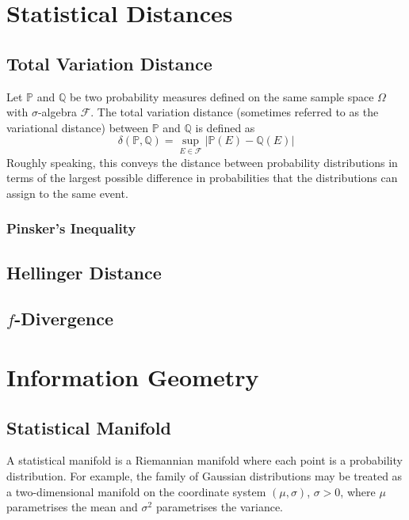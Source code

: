 \documentclass[11pt]{report} %
\begin{document}
\section{Statistical Distances}

\subsection{Total Variation Distance}

Let $\mathbb{P}$ and $\mathbb{Q}$ be two probability measures defined on the same sample space $\Omega$ with $\sigma$-algebra $\mathcal{F}$. The total variation distance (sometimes referred to as the variational distance) between  $\mathbb{P}$ and $\mathbb{Q}$ is defined as
\begin{equation}
\delta\left(\mathbb{P}, \mathbb{Q}\right) = \sup_{E\in\mathcal{F}}\left|\mathbb{P}\left(E\right) - \mathbb{Q}\left(E\right)\right|
\end{equation}
Roughly speaking, this conveys the distance between probability distributions in terms of the largest possible difference in probabilities that the distributions can assign to the same event.

\subsubsection{Pinsker's Inequality}

\subsection{Hellinger Distance}

\subsection{$f$-Divergence}

\section{Information Geometry}

\subsection{Statistical Manifold}

A statistical manifold is a Riemannian manifold where each point is a probability distribution. For example, the family of Gaussian distributions may be treated as a two-dimensional manifold on the coordinate system $\left(\mu, \sigma\right)$, $\sigma > 0$, where $\mu$ parametrises the mean and $\sigma^{2}$ parametrises the variance.
\end{document}
